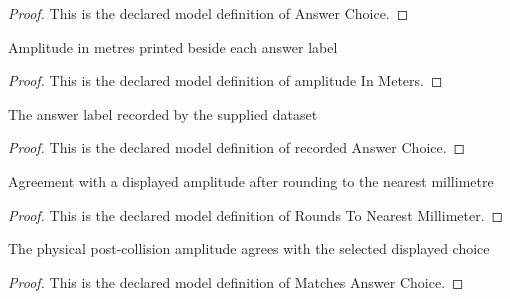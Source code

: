 \begin{proof}
  This is the declared model definition of Answer Choice.
\end{proof}
\begin{definition}
  \label{def:physics:phyx-mini-0261:phyxminiproblems-problemphyxmini0261-answerchoice-amplitudeinmeters}
  Amplitude in metres printed beside each answer label
\end{definition}
\begin{proof}
  This is the declared model definition of amplitude In Meters.
\end{proof}
\begin{definition}
  \label{def:physics:phyx-mini-0261:phyxminiproblems-problemphyxmini0261-recordedanswerchoice}
  The answer label recorded by the supplied dataset
\end{definition}
\begin{proof}
  This is the declared model definition of recorded Answer Choice.
\end{proof}
\begin{definition}
  \label{def:physics:phyx-mini-0261:phyxminiproblems-problemphyxmini0261-roundstonearestmillimeter}
  Agreement with a displayed amplitude after rounding to the nearest millimetre
\end{definition}
\begin{proof}
  This is the declared model definition of Rounds To Nearest Millimeter.
\end{proof}
\begin{definition}
  \label{def:physics:phyx-mini-0261:phyxminiproblems-problemphyxmini0261-matchesanswerchoice}
  The physical post-collision amplitude agrees with the selected displayed choice
\end{definition}
\begin{proof}
  This is the declared model definition of Matches Answer Choice.
\end{proof}
